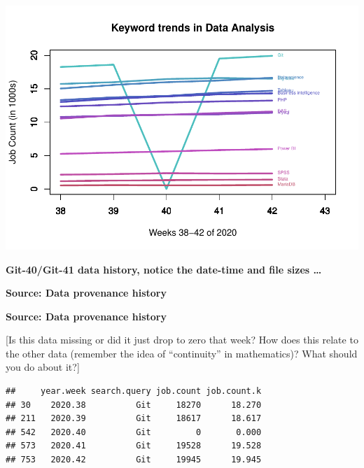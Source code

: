 \documentclass[
]{article}
\newenvironment{Shaded}{\begin{snugshade}}{\end{snugshade}}
\newcommand{\CommentTok}[1]{\textcolor[rgb]{0.56,0.35,0.01}{\textit{#1}}}
\newcommand{\FloatTok}[1]{\textcolor[rgb]{0.00,0.00,0.81}{#1}}
\newcommand{\KeywordTok}[1]{\textcolor[rgb]{0.13,0.29,0.53}{\textbf{#1}}}
\newcommand{\NormalTok}[1]{#1}
\newcommand{\OperatorTok}[1]{\textcolor[rgb]{0.81,0.36,0.00}{\textbf{#1}}}
\newcommand{\StringTok}[1]{\textcolor[rgb]{0.31,0.60,0.02}{#1}}
\begin{document}
\includegraphics{graphics/chunk-plotting-jobs-trends-github-problem-1.pdf}

\textbf{Git-40/Git-41 data history, notice the date-time and file sizes
\ldots{}}

\textbf{Source: Data provenance history}

\textbf{Source: Data provenance history}

{[}Is this data missing or did it just drop to zero that week? How does
this relate to the other data (remember the idea of ``continuity'' in
mathematics)? What should you do about it?{]}

\begin{Shaded}
\end{Shaded}

\begin{verbatim}
##     year.week search.query job.count job.count.k
## 30    2020.38          Git     18270      18.270
## 211   2020.39          Git     18617      18.617
## 542   2020.40          Git         0       0.000
## 573   2020.41          Git     19528      19.528
## 753   2020.42          Git     19945      19.945
\end{verbatim}
\end{document}

